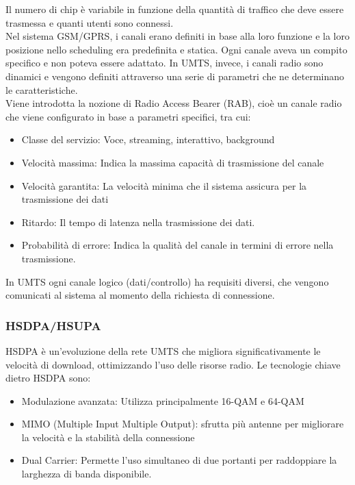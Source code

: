 Il numero di chip è variabile in funzione della quantità di traffico che deve essere trasmessa e quanti utenti sono connessi.\\

Nel sistema GSM/GPRS, i canali erano definiti in base alla loro funzione e la loro posizione nello scheduling era predefinita e statica. Ogni canale aveva un compito specifico e non poteva essere adattato.  In UMTS, invece, i canali radio sono dinamici e vengono definiti attraverso una serie di parametri che ne determinano le caratteristiche. \\

Viene introdotta la nozione di Radio Access Bearer (RAB), cioè un canale radio che viene configurato in base a parametri specifici, tra cui:
\begin{itemize}
	\item Classe del servizio: Voce, streaming, interattivo, background
	\item Velocità massima: Indica la massima capacità di trasmissione del canale
	\item Velocità garantita: La velocità minima che il sistema assicura per la trasmissione dei dati
	\item Ritardo: Il tempo di latenza nella trasmissione dei dati.
	\item Probabilità di errore: Indica la qualità del canale in termini di errore nella trasmissione.
\end{itemize}

In UMTS ogni canale logico (dati/controllo) ha requisiti diversi, che vengono comunicati al sistema al momento della richiesta di connessione. \\

\subsubsection{HSDPA/HSUPA}

HSDPA è un'evoluzione della rete UMTS che migliora significativamente le velocità di download, ottimizzando l’uso delle risorse radio. Le tecnologie chiave dietro HSDPA sono:
\begin{itemize}
	\item Modulazione avanzata: Utilizza principalmente 16-QAM e 64-QAM
	\item MIMO (Multiple Input Multiple Output): sfrutta più antenne per migliorare la velocità e la stabilità della connessione
	\item Dual Carrier: Permette l'uso simultaneo di due portanti per raddoppiare la larghezza di banda disponibile.
\end{itemize}

